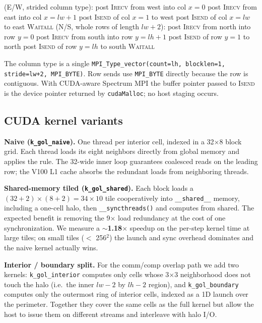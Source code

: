 \documentclass[sigconf,nonacm,10pt]{acmart}
\begin{document}
\begin{algorithm}[t]
\caption{Two-phase halo exchange (per timestep).}
\label{alg:halo}
\begin{algorithmic}[1]
 (E/W, strided column type):
\State \quad post \textsc{Irecv} from west into col $x=0$
\State \quad post \textsc{Irecv} from east into col $x=\mathit{lw}+1$
\State \quad post \textsc{Isend} of col $x=1$ to west
\State \quad post \textsc{Isend} of col $x=\mathit{lw}$ to east
\State \quad \textsc{Waitall}
 (N/S, whole rows of length $\mathit{lw}+2$):
\State \quad post \textsc{Irecv} from north into row $y=0$
\State \quad post \textsc{Irecv} from south into row $y=\mathit{lh}+1$
\State \quad post \textsc{Isend} of row $y=1$ to north
\State \quad post \textsc{Isend} of row $y=\mathit{lh}$ to south
\State \quad \textsc{Waitall}
\end{algorithmic}
\end{algorithm}

The column type is a single \texttt{MPI\_Type\_vector(count=lh,
blocklen=1, stride=lw+2, MPI\_BYTE)}. Row sends use
\texttt{MPI\_BYTE} directly because the row is contiguous. With
CUDA-aware Spectrum MPI the buffer pointer passed to \textsc{Isend} is
the device pointer returned by \texttt{cudaMalloc}; no host staging
occurs.

\subsection{CUDA kernel variants}

\textbf{Naive (\texttt{k\_gol\_naive}).} One thread per interior cell,
indexed in a 32$\times$8 block grid. Each thread loads its eight
neighbors directly from global memory and applies the rule. The 32-wide
inner loop guarantees coalesced reads on the leading row;
the V100 L1 cache absorbs the redundant loads from neighboring
threads.

\textbf{Shared-memory tiled (\texttt{k\_gol\_shared}).} Each block
loads a $(32+2)\times(8+2)=34\times 10$ tile cooperatively into
\texttt{\_\_shared\_\_} memory, including a one-cell halo, then
\texttt{\_\_syncthreads()} and computes from shared. The expected
benefit is removing the 9$\times$ load redundancy at the cost of one
synchronization. We measure a $\sim$\textbf{1.18$\times$} speedup
on the per-step kernel time at large tiles; on small tiles
($<$ 256$^2$) the launch and sync overhead dominates and the naive
kernel actually wins.

\textbf{Interior / boundary split.} For the comm/comp overlap path we
add two kernels: \texttt{k\_gol\_interior} computes only cells whose
3$\times$3 neighborhood does not touch the halo (i.e.\ the inner
$\mathit{lw}-2$ by $\mathit{lh}-2$ region), and \texttt{k\_gol\_boundary}
computes only the outermost ring of interior cells, indexed as a
1D launch over the perimeter. Together they cover the same cells as
the full kernel but allow the host to issue them on different streams
and interleave with halo I/O.
\end{document}
